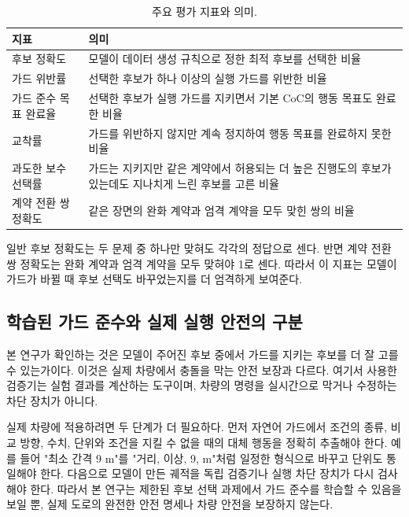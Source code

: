 \begin{table}[t]
\centering
\caption{주요 평가 지표와 의미.}
\label{tab:method-metrics}
\footnotesize
\begin{tabularx}{\columnwidth}{L{0.31\columnwidth}Y}
\toprule
지표 & 의미 \\
\midrule
후보 정확도 & 모델이 데이터 생성 규칙으로 정한 최적 후보를 선택한 비율 \\
가드 위반률 & 선택한 후보가 하나 이상의 실행 가드를 위반한 비율 \\
가드 준수 목표 완료율 & 선택한 후보가 실행 가드를 지키면서 기본 CoC의 행동 목표도 완료한 비율 \\
교착률 & 가드를 위반하지 않지만 계속 정지하여 행동 목표를 완료하지 못한 비율 \\
과도한 보수 선택률 & 가드는 지키지만 같은 계약에서 허용되는 더 높은 진행도의 후보가 있는데도 지나치게 느린 후보를 고른 비율 \\
계약 전환 쌍 정확도 & 같은 장면의 완화 계약과 엄격 계약을 모두 맞힌 쌍의 비율 \\
\bottomrule
\end{tabularx}
\end{table}

일반 후보 정확도는 두 문제 중 하나만 맞혀도 각각의 정답으로 센다. 반면 계약 전환 쌍 정확도는 완화 계약과 엄격 계약을 모두 맞혀야 1로 센다. 따라서 이 지표는 모델이 가드가 바뀔 때 후보 선택도 바꾸었는지를 더 엄격하게 보여준다.

\subsection{학습된 가드 준수와 실제 실행 안전의 구분}

본 연구가 확인하는 것은 모델이 주어진 후보 중에서 가드를 지키는 후보를 더 잘 고를 수 있는가이다. 이것은 실제 차량에서 충돌을 막는 안전 보장과 다르다. 여기서 사용한 검증기는 실험 결과를 계산하는 도구이며, 차량의 명령을 실시간으로 막거나 수정하는 차단 장치가 아니다.

실제 차량에 적용하려면 두 단계가 더 필요하다. 먼저 자연어 가드에서 조건의 종류, 비교 방향, 수치, 단위와 조건을 지킬 수 없을 때의 대체 행동을 정확히 추출해야 한다. 예를 들어 "최소 간격 9 m"를 "거리, 이상, 9, m"처럼 일정한 형식으로 바꾸고 단위도 통일해야 한다. 다음으로 모델이 만든 궤적을 독립 검증기나 실행 차단 장치가 다시 검사해야 한다. 따라서 본 연구는 제한된 후보 선택 과제에서 가드 준수를 학습할 수 있음을 보일 뿐, 실제 도로의 완전한 안전 명세나 차량 안전을 보장하지 않는다.
